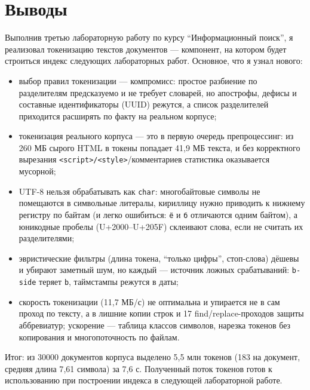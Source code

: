 \section{Выводы}
Выполнив третью лабораторную работу по курсу \enquote{Информационный поиск}, я
реализовал токенизацию текстов документов --- компонент, на котором будет
строиться индекс следующих лабораторных работ. Основное, что я узнал нового:

\begin{itemize}
    \item выбор правил токенизации --- компромисс: простое разбиение по
    разделителям предсказуемо и не требует словарей, но апострофы, дефисы и
    составные идентификаторы (UUID) режутся, а список разделителей приходится
    расширять по факту на реальном корпусе;
    \item токенизация реального корпуса --- это в первую очередь препроцессинг:
    из 260 МБ сырого HTML в токены попадает 41{,}9 МБ текста, и без корректного
    вырезания \texttt{<script>/<style>}/комментариев статистика оказывается
    мусорной;
    \item UTF-8 нельзя обрабатывать как \texttt{char}: многобайтовые символы не
    помещаются в символьные литералы, кириллицу нужно приводить к нижнему
    регистру по байтам (и легко ошибиться: \texttt{ё} и \texttt{б} отличаются
    одним байтом), а юникодные пробелы (U+2000--U+205F) склеивают слова, если
    не считать их разделителями;
    \item эвристические фильтры (длина токена, \enquote{только цифры}, стоп-слова)
    дёшевы и убирают заметный шум, но каждый --- источник ложных срабатываний:
    \texttt{b-side} теряет \texttt{b}, таймстампы режутся в даты;
    \item скорость токенизации (11{,}7 МБ/с) не оптимальна и упирается не в
    сам проход по тексту, а в лишние копии строк и 17 find/replace-проходов
    защиты аббревиатур; ускорение --- таблица классов символов, нарезка токенов
    без копирования и многопоточность по файлам.
\end{itemize}

Итог: из 30000 документов корпуса выделено 5{,}5 млн токенов (183 на документ,
средняя длина 7{,}61 символа) за 7{,}6 с. Полученный поток токенов готов к
использованию при построении индекса в следующей лабораторной работе.

\pagebreak

